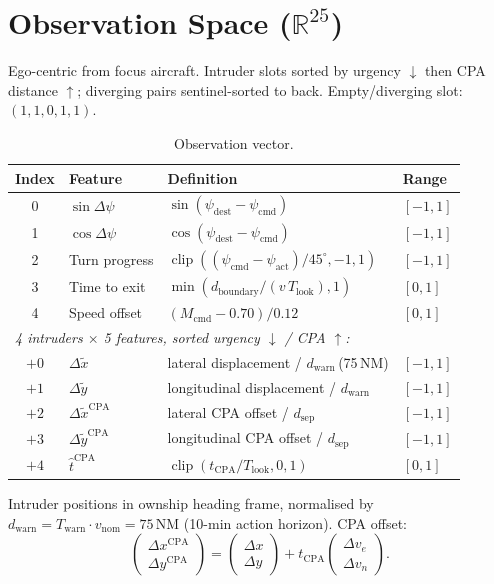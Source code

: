 \documentclass[11pt, a4paper]{article}
\begin{document}
\section{Observation Space ($\mathbb{R}^{25}$)}

Ego-centric from focus aircraft. Intruder slots sorted by urgency $\downarrow$
then CPA distance $\uparrow$; diverging pairs sentinel-sorted to back.
Empty/diverging slot: $(1,1,0,1,1)$.

\begin{table}[h]
\centering
\caption{Observation vector.}
\label{tab:obs}
\smallskip
\begin{tabular}{clll}
\toprule
\textbf{Index} & \textbf{Feature} & \textbf{Definition} & \textbf{Range} \\
\midrule
0 & $\sin\Delta\psi$ & $\sin(\psi_\text{dest}-\psi_\text{cmd})$ & $[-1,1]$ \\
1 & $\cos\Delta\psi$ & $\cos(\psi_\text{dest}-\psi_\text{cmd})$ & $[-1,1]$ \\
2 & Turn progress & $\operatorname{clip}((\psi_\text{cmd}-\psi_\text{act})/45^\circ,-1,1)$ & $[-1,1]$ \\
3 & Time to exit & $\min(d_\text{boundary}/(v\,T_\text{look}),1)$ & $[0,1]$ \\
4 & Speed offset & $(M_\text{cmd}-0.70)/0.12$ & $[0,1]$ \\[4pt]
\multicolumn{4}{l}{\textit{4 intruders $\times$ 5 features, sorted urgency $\downarrow$ / CPA $\uparrow$:}} \\
$+0$ & $\Delta\tilde{x}$ & lateral displacement / $d_\text{warn}$\,(75\,NM) & $[-1,1]$ \\
$+1$ & $\Delta\tilde{y}$ & longitudinal displacement / $d_\text{warn}$ & $[-1,1]$ \\
$+2$ & $\Delta\tilde{x}^\text{CPA}$ & lateral CPA offset / $d_\text{sep}$ & $[-1,1]$ \\
$+3$ & $\Delta\tilde{y}^\text{CPA}$ & longitudinal CPA offset / $d_\text{sep}$ & $[-1,1]$ \\
$+4$ & $\hat{t}^\text{CPA}$ & $\operatorname{clip}(t_\text{CPA}/T_\text{look},0,1)$ & $[0,1]$ \\
\bottomrule
\end{tabular}
\end{table}

Intruder positions in ownship heading frame, normalised by
$d_\text{warn} = T_\text{warn}\cdot v_\text{nom} = 75$\,NM (10-min action horizon).
CPA offset:
\begin{equation}
    \begin{pmatrix}\Delta x^\text{CPA}\\\Delta y^\text{CPA}\end{pmatrix}
        = \begin{pmatrix}\Delta x\\\Delta y\end{pmatrix}
        + t_\text{CPA}\begin{pmatrix}\Delta v_e\\\Delta v_n\end{pmatrix}.
\end{equation}
\end{document}
